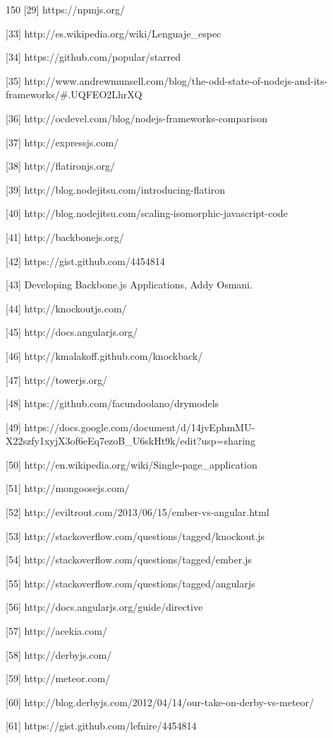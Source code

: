 \documentclass[doc,helv,longtable]{article}
\begin{document}
\begin{thebibliography}{150}
[29] https://npmjs.org/




[33] http://es.wikipedia.org/wiki/Lenguaje_espec%

[34] https://github.com/popular/starred

[35] http://www.andrewmunsell.com/blog/the-odd-state-of-nodejs-and-its-frameworks/#.UQFEO2LhrXQ

[36] http://ocdevel.com/blog/nodejs-frameworks-comparison

[37] http://expressjs.com/

[38] http://flatironjs.org/

[39] http://blog.nodejitsu.com/introducing-flatiron

[40] http://blog.nodejitsu.com/scaling-isomorphic-javascript-code

[41] http://backbonejs.org/

[42] https://gist.github.com/4454814

[43] Developing Backbone.js Applications, Addy Osmani.

[44] http://knockoutjs.com/

[45] http://docs.angularjs.org/

[46] http://kmalakoff.github.com/knockback/

[47] http://towerjs.org/

[48] https://github.com/facundoolano/drymodels

[49] https://docs.google.com/document/d/14jvEphmMU-X22szfy1xyjX3of6eEq7ezoB_U6skHt9k/edit?usp=sharing

[50] http://en.wikipedia.org/wiki/Single-page_application

[51] http://mongoosejs.com/

[52] http://eviltrout.com/2013/06/15/ember-vs-angular.html

[53] http://stackoverflow.com/questions/tagged/knockout.js

[54] http://stackoverflow.com/questions/tagged/ember.js

[55] http://stackoverflow.com/questions/tagged/angularjs

[56] http://docs.angularjs.org/guide/directive

[57] http://acekia.com/

[58] http://derbyjs.com/

[59] http://meteor.com/

[60] http://blog.derbyjs.com/2012/04/14/our-take-on-derby-vs-meteor/

[61] https://gist.github.com/lefnire/4454814


\end{thebibliography}
\end{document}
